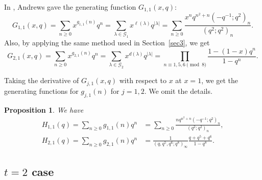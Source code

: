 \documentclass[11pt,reqno]{amsart}
\newtheorem{proposition}[theorem]{Proposition}
\theoremstyle{remark}
\numberwithin{equation}{section}
\begin{document}
In \cite[Eq. (2.20)]{andrews_siam}, Andrews gave the generating function $G_{1,1}(x,q)$:
\[
	G_{1,1}(x,q)= \sum_{n\ge 0} x^{g_{1,1}(n)} q^{n} =\sum_{\lambda\in \mathcal{G}_1}  x^{\ell(\lambda)} q^{|\lambda|} %
    =\sum_{n\ge 0} \frac{x^n q^{n^2+n}(-q^{-1};q^2)_n}{(q^2;q^2)_n}. 
\]
Also, by applying the same method used in Section~\ref{sec3}, we get
\[
	G_{2,1}(x,q)= \sum_{n\ge 0} x^{g_{2,1}(n)} q^{n}   =\sum_{\lambda\in \mathcal{G}_2} x^{d(\lambda)} q^{|\lambda|} = \prod_{n\equiv 1,5,6 \!\!\!\pmod{8}} \frac{1-(1-x)q^n}{1-q^n}.
\]

Taking the derivative of $G_{j,1}(x,q)$ with respect to $x$ at $x=1$, we get the generating functions for $g_{j,1}(n)$ for $j=1,2$. We omit the details. 
\begin{proposition} \label{gen_H1}
    We have
\begin{align*}
	H_{1,1}(q)=\sum_{n\ge 0} g_{1,1}(n)q^n &= \sum_{n\ge 0} \frac{ n q^{n^2+n} (-q^{-1};q^2)_n}{(q^2;q^2)_n}, \\
	H_{2,1}(q)=\sum_{n\ge 0} g_{2,1}(n)q^n &= \frac{1}{(q, q^5, q^6;q^8)_{\infty}} \frac{q+q^5+q^6}{1-q^{8}}. 
\end{align*}
\end{proposition}


\subsection{$t=2$ case}\label{sec5.2}
\end{document}
